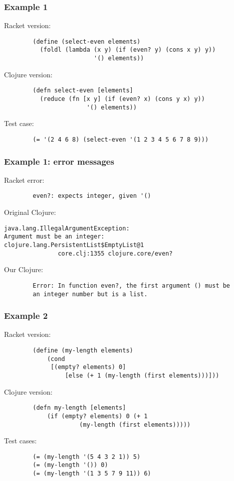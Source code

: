 \documentclass{beamer}
\begin{document}
\begin{frame}[fragile]
\frametitle{Example 1}
Racket version:
\begin{verbatim}
		(define (select-even elements) 
		  (foldl (lambda (x y) (if (even? y) (cons x y) y)) 
                         '() elements))
\end{verbatim}
Clojure version:  
\begin{verbatim}
		(defn select-even [elements] 
		  (reduce (fn [x y] (if (even? x) (cons y x) y))  
                       '() elements))
\end{verbatim}
Test case:
\begin{verbatim}
		(= '(2 4 6 8) (select-even '(1 2 3 4 5 6 7 8 9)))
\end{verbatim}
\end{frame}


\begin{frame}[fragile]
\frametitle{Example 1: error messages}
Racket error:
\begin{verbatim}
		even?: expects integer, given '()
\end{verbatim}

Original Clojure:
\begin{verbatim}
java.lang.IllegalArgumentException: 
Argument must be an integer: 
clojure.lang.PersistentList$EmptyList@1
               core.clj:1355 clojure.core/even?	
\end{verbatim}

Our Clojure: 
\begin{verbatim}
		Error: In function even?, the first argument () must be
		an integer number but is a list.
\end{verbatim}
\end{frame}

\begin{frame}[fragile]
\frametitle{Example 2}
Racket version:
\begin{verbatim}
		(define (my-length elements)
  			(cond
 			 [(empty? elements) 0]
			 	 [else (+ 1 (my-length (first elements)))]))
\end{verbatim}
Clojure version:  
\begin{verbatim}
		(defn my-length [elements]
 			(if (empty? elements) 0 (+ 1 
                     (my-length (first elements)))))
\end{verbatim}
Test cases:
\begin{verbatim}
		(= (my-length '(5 4 3 2 1)) 5)
		(= (my-length '()) 0)
		(= (my-length '(1 3 5 7 9 11)) 6)
\end{verbatim}
\end{frame}
\end{document}
